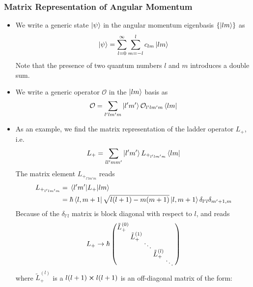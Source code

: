 \documentclass[11pt, a4paper]{article}
\renewcommand{\t}[1]{\tilde{#1}}
\renewcommand{\O}{\mathcal{O}}  %
\newcommand{\p}{\psi}  %
\renewcommand{\b}[1]{\bra{#1}}
\renewcommand{\k}[1]{\ket{#1}}
\begin{document}
\subsubsection{Matrix Representation of Angular Momentum}
\begin{itemize}
	\item We write a generic state $ \ket{\p} $ in the angular momentum eigenbasis $ \{\ket{lm}\} $ as
	\begin{equation*}
		\k{\p} = \sum_{l = 0}^{\infty}\sum_{m=-l}^{l}c_{lm}\ket{lm}
	\end{equation*}
	Note that the presence of two quantum numbers $ l $ and $ m $ introduces a double sum.
	
	\item We write a generic operator $ \O $ in the $ \k{lm} $ basis as
	\begin{equation*}
		\O = \sum_{l'lm'm}\k{l'm'}\O_{l'lm'm}\bra{lm}
	\end{equation*}
	
	\iffalse
	
	\item As an example, we find the matrix representation of the ladder operator $ L_{+} $, i.e.
	\begin{equation*}
		L_{+} = \sum_{ll'mm'}\k{l'm'}L_{+_{l'lm'm}}\bra{lm}
	\end{equation*}
	The matrix element $ L_{+_{l'lm'm}} $ reads
	\begin{align*}
		L_{+_{l'lm'm}} &= \mel{l'm'}{L_{+}}{lm}\\
		& = \hbar \b{l, m+1}\sqrt{l (l+1) - m(m+1)}\k{l, m+1}\delta_{l'l}\delta_{m'+1,m}
	\end{align*}
	Because of the $ \delta_{l'l} $ matrix is block diagonal with respect to $ l $, and reads
	\begin{equation*}
	\begingroup
	\setlength\arraycolsep{1.0pt}
	\renewcommand*{\arraystretch}{0}
		L_{+} \to \hbar
		\begin{pmatrix}
		 \t{L}_{+}^{(0)}   & & & & \\
		 & \t{L}_{+}^{(1)}   & & & \\[-0.4em]
		 & & \ddots           & & \\
		 & & & \t{L}_{+}^{(l)}   & \\[-0.4em]
		 & & & & \ddots         & \\
		\end{pmatrix}
	\endgroup
	\end{equation*}
	where $ \t{L}_{+}^{(l)} $ is a $ l(l+1) \cross l(l+1) $ is an off-diagonal matrix of the form: 
	

\end{itemize}
\end{document}
